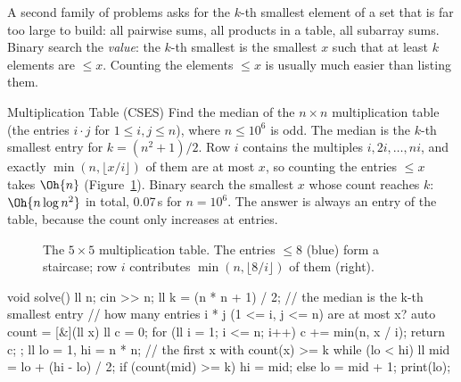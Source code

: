 A second family of problems asks for the $k$-th smallest element of a set that is far too large to build: all pairwise sums,
all products in a table, all subarray sums. Binary search the \emph{value}: the $k$-th smallest is the smallest $x$ such that
at least $k$ elements are $\le x$. Counting the elements $\le x$ is usually much easier than listing them.

\begin{problem}{Multiplication Table (CSES)}
Find the median of the $n \times n$ multiplication table (the entries $i \cdot j$ for $1 \le i, j \le n$), where $n \le 10^6$
is odd.
\solution The median is the $k$-th smallest entry for $k = (n^2 + 1)/2$. Row $i$ contains the multiples $i, 2i, \ldots, ni$,
and exactly $\min(n, \lfloor x / i\rfloor)$ of them are at most $x$, so counting the entries $\le x$ takes $\Oh{n}$
(Figure~\ref{fig:multtable}). Binary search the smallest $x$ whose count reaches $k$: $\Oh{n \log n^2}$ in total, 0.07\,s for
$n = 10^6$. The answer is always an entry of the table, because the count only increases at entries.
\end{problem}

\begin{figure}[htbp]
\centering
{}
\caption{The $5 \times 5$ multiplication table. The entries $\le 8$ (blue) form a staircase; row $i$ contributes
$\min(n, \lfloor 8/i \rfloor)$ of them (right).}
\label{fig:multtable}
\end{figure}

\begin{code}
void solve() {
    ll n;
    cin >> n;
    ll k = (n * n + 1) / 2;  // the median is the k-th smallest entry
    // how many entries i * j (1 <= i, j <= n) are at most x?
    auto count = [&](ll x) {
        ll c = 0;
        for (ll i = 1; i <= n; i++) c += min(n, x / i);
        return c;
    };
    ll lo = 1, hi = n * n;  // the first x with count(x) >= k
    while (lo < hi) {
        ll mid = lo + (hi - lo) / 2;
        if (count(mid) >= k) hi = mid;
        else lo = mid + 1;
    }
    print(lo);
}
\end{code}

